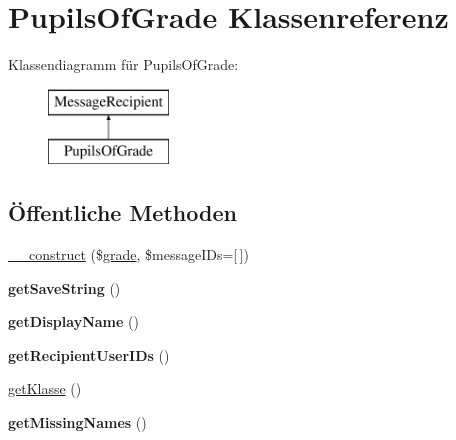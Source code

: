 \hypertarget{class_pupils_of_grade}{}\section{Pupils\+Of\+Grade Klassenreferenz}
\label{class_pupils_of_grade}
Klassendiagramm für Pupils\+Of\+Grade\+:\begin{figure}[H]
\begin{center}
\leavevmode
\includegraphics[height=2.000000cm]{class_pupils_of_grade}
\end{center}
\end{figure}
\subsection*{Öffentliche Methoden}
\begin{DoxyCompactItemize}
\item 
\mbox{\hyperlink{class_pupils_of_grade_a78a1e06316d761f5719eee6225088136}{\+\_\+\+\_\+construct}} (\$\mbox{\hyperlink{classgrade}{grade}}, \$message\+I\+Ds=\mbox{[}$\,$\mbox{]})
\item 
\mbox{\label{class_pupils_of_grade_aeffd1e4e2c992bb0765d3bad98876ad4}} 
{\bfseries get\+Save\+String} ()
\item 
\mbox{\label{class_pupils_of_grade_a10672a6d46c58e02ca9e440b86d7511c}} 
{\bfseries get\+Display\+Name} ()
\item 
\mbox{\label{class_pupils_of_grade_acff99354dd0fa2b8f06328dfaaa1166f}} 
{\bfseries get\+Recipient\+User\+I\+Ds} ()
\item 
\mbox{\hyperlink{class_pupils_of_grade_a83f529436017451f580617d71ee696f6}{get\+Klasse}} ()
\item 
\mbox{\label{class_pupils_of_grade_a7f36b41d21f0701dd320f86a45e98cd9}} 
{\bfseries get\+Missing\+Names} ()
\end{DoxyCompactItemize}
